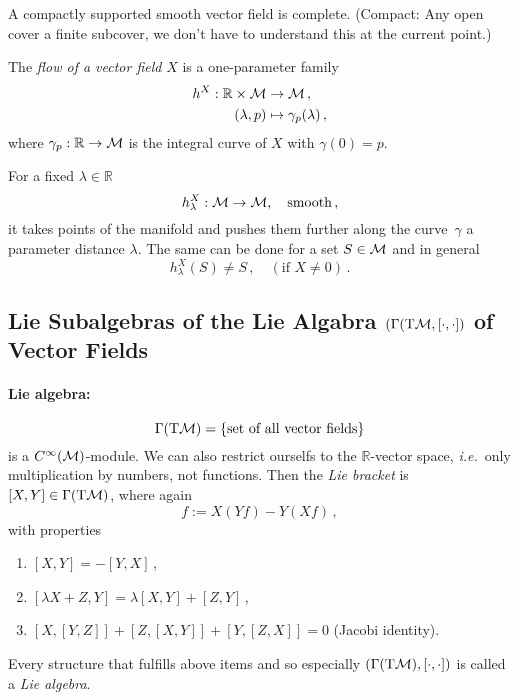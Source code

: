 \begin{theorem}[]
    A compactly supported smooth vector field is complete.
    (Compact: Any open cover a finite subcover, we don't have to understand this at
    the current point.)
\end{theorem}
\begin{defn}
    The \textit{flow of a vector field} $X$ is a one-parameter family
    \begin{align}
        h^X: \mathbb{R}\times\mathcal{M} &\to \mathcal{M}\,,\\
        (\lambda, p) &\mapsto \gamma_p(\lambda)\,,
    \end{align}
    where $\gamma_p:\mathbb{R}\to\mathcal{M}$ is the integral curve of $X$ with
    $\gamma(0) = p$.
\end{defn}
\begin{note}
    For a fixed $\lambda\in\mathbb{R}$
    \begin{equation}
        h^X_\lambda: \mathcal{M} \to \mathcal{M}, \quad\text{smooth}\,,
    \end{equation}
    it takes points of the manifold and pushes them further along the 
    curve~$\gamma$ a parameter distance $\lambda$.
    The same can be done for a set $S\in\mathcal{M}$ and in general
    \begin{equation}
        h^X_\lambda(S) \neq S\,,\quad(\text{if }X\neq 0)\,.
    \end{equation}
\end{note}

\subsection[Lie Subalgebras of the Lie Algabra of Vector Fields]{Lie Subalgebras of the
    Lie Algabra $(\Gamma(\T \M, [\cdot,\cdot])$ of Vector Fields}
    \paragraph{Lie algebra:}
    \begin{equation}
        \Gamma(\T\M) = \{\text{set of all vector fields}\}
    \end{equation}
    is a $C^\infty(\mathcal{M})$-module.
    We can also restrict ourselfs to the $\mathbb{R}$-vector space,
    \textit{i.e.}\ only multiplication by numbers, not functions.
    Then the \textit{Lie bracket} is $[X,Y]\in\Gamma(\T\M)$, where again
    \begin{equation}
        [X,Y]f := X(Yf) - Y(Xf)\,,
    \end{equation}
    with properties
    \begin{enumerate}
        \item $[X,Y] = - [Y,X]$\,,
        \item $[\lambda X + Z, Y] = \lambda[X,Y] + [Z, Y]$\,,
        \item $[X,[Y,Z]] + [Z,[X,Y]] + [Y, [Z,X]] = 0$ (Jacobi identity).
    \end{enumerate}
    Every structure that fulfills above items and so especially
    $(\Gamma(\T\M), [\cdot,\cdot])$ is called a \textit{Lie algebra}.

